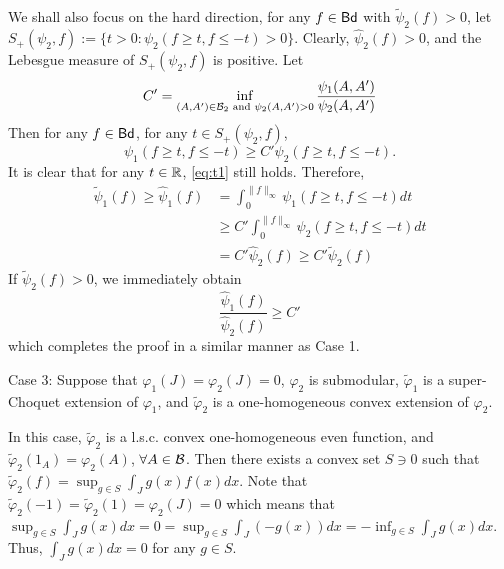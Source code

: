 \documentclass[12pt,a4paper]{article}
\begin{document}
We shall also focus on the hard direction, for any $f\in {\sf Bd} $ with $\widetilde{\psi}_2(f)>0$, let $S_+(\psi_2,f):=\{t>0: \psi_2(f\ge t,f\le-t)>0\}$. Clearly, $\widehat{\psi}_2(f)>0$, and the Lebesgue measure of $S_+(\psi_2,f)$ is positive. Let $$C'=\inf_{(A,A')\in \mathcal{B}_2\text{ and }\psi_2(A,A')>0}\frac{\psi_1(A,A')}{\psi_2(A,A')}$$
Then for any $f\in {\sf Bd} $, for any $t\in S_+(\psi_2,f)$, 
\begin{equation}\label{eq:t1}
\psi_1(f\ge t,f\le-t)\ge C' \psi_2(f\ge t,f\le-t).    
\end{equation}
It is clear that for any $t\in\mathbb{R}$, \eqref{eq:t1} still holds. Therefore, 
\begin{align*}
\widetilde{\psi}_1(f)\ge \widehat{\psi}_1(f)&=\int_{0}^{\|f\|_\infty} \psi_1(f\ge t,f\le-t)dt
\\&\ge C'\int_{0}^{\|f\|_\infty} \psi_2(f\ge t,f\le-t)dt
\\&=C' \widehat{\psi}_2(f)\ge C' \widetilde{\psi}_2(f)
\end{align*} 
If $\widetilde{\psi}_2(f)>0$, we immediately obtain 
$$ \frac{\widehat{\psi}_1(f)}{\widehat{\psi}_2(f)}\ge C'$$
which completes the proof in a similar manner as Case 1.

\vspace{0.2cm}

\noindent Case 3:  Suppose that $\varphi_1(J)=\varphi_2(J)=0$, $\varphi_2$ is submodular,   $\widetilde{\varphi}_1$ is a super-Choquet extension  of $\varphi_1$, and $\widetilde{\varphi}_2$ is a one-homogeneous convex extension of $\varphi_2$. 



In this case, $\widetilde{\varphi}_2$ is a l.s.c. convex one-homogeneous even function, and  $\widetilde{\varphi}_2(1_A)=\varphi_2(A)$, $\forall A\in\mathcal{B}$. %
Then there exists a convex set $S\ni0$ such that  $\widetilde{\varphi}_2(f)=\sup_{g\in S}\int_J g(x)f(x)dx$.  
Note that $\widetilde{\varphi}_2(-1)=\widetilde{\varphi}_2(1)=\varphi_2(J)=0$ which means that $\sup_{g\in S}\int_J g(x)dx=0=\sup_{g\in S}\int_J (-g(x))dx=-\inf_{g\in S}\int_J g(x)dx$. Thus, $\int_J g(x)dx=0$ for any $g\in S$. 
\end{document}
